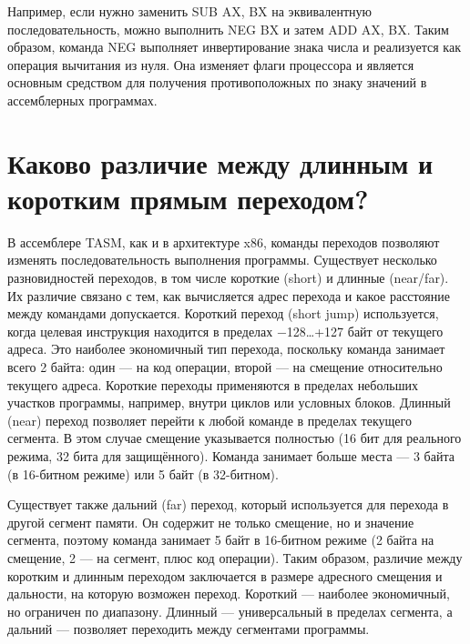 Например, если нужно заменить SUB AX, BX на эквивалентную последовательность, можно выполнить NEG BX и затем ADD AX, BX.
Таким образом, команда NEG выполняет инвертирование знака числа и реализуется как операция вычитания из нуля.
Она изменяет флаги процессора и является основным средством для получения противоположных по знаку значений в ассемблерных программах.


\section{Каково различие между длинным и коротким прямым переходом?}

В ассемблере TASM, как и в архитектуре x86, команды переходов позволяют изменять последовательность выполнения программы.
Существует несколько разновидностей переходов, в том числе короткие (short) и длинные (near/far).
Их различие связано с тем, как вычисляется адрес перехода и какое расстояние между командами допускается.
Короткий переход (short jump) используется, когда целевая инструкция находится в пределах −128…+127 байт от текущего адреса.
Это наиболее экономичный тип перехода, поскольку команда занимает всего 2 байта: один — на код операции, второй — на смещение относительно текущего адреса.
Короткие переходы применяются в пределах небольших участков программы, например, внутри циклов или условных блоков.
Длинный (near) переход позволяет перейти к любой команде в пределах текущего сегмента.
В этом случае смещение указывается полностью (16 бит для реального режима, 32 бита для защищённого).
Команда занимает больше места — 3 байта (в 16-битном режиме) или 5 байт (в 32-битном).

Существует также дальний (far) переход, который используется для перехода в другой сегмент памяти.
Он содержит не только смещение, но и значение сегмента, поэтому команда занимает 5 байт в 16-битном режиме (2 байта на смещение, 2 — на сегмент, плюс код операции).
Таким образом, различие между коротким и длинным переходом заключается в размере адресного смещения и дальности, на которую возможен переход.
Короткий — наиболее экономичный, но ограничен по диапазону.
Длинный — универсальный в пределах сегмента, а дальний — позволяет переходить между сегментами программы.

